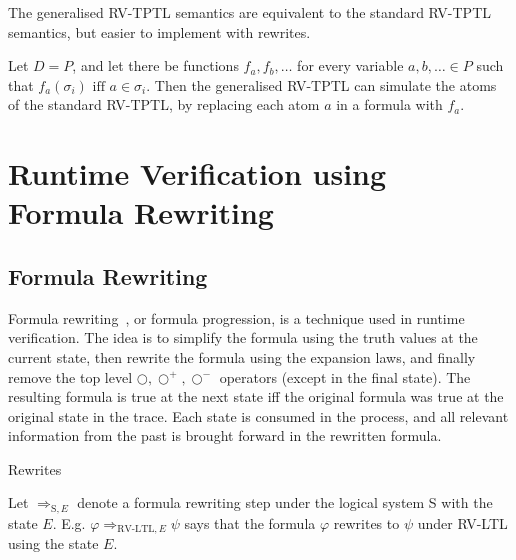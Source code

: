 \documentclass[a4paper]{article}
\newcommand{\tiff}{\text{ iff }}
\newcommand{\sn}{\bigcirc^+}
\newcommand{\wn}{\bigcirc^-}
\newcommand{\rw}[1]{\Rightarrow_{#1}}
\begin{document}
The generalised RV-TPTL semantics are equivalent to the standard RV-TPTL semantics, but easier to implement with rewrites. %

\begin{remk}
  Let $D = P$, and let there be functions $f_a,f_b,\dots$ for every variable $a,b,\dots\in P$ such that $f_a(\sigma_i) \tiff a\in \sigma_i$. Then the generalised RV-TPTL can simulate the atoms of the standard RV-TPTL, by replacing each atom $a$ in a formula with $f_a$.

\end{remk}

\section{Runtime Verification using Formula Rewriting}
\subsection{Formula Rewriting}
Formula rewriting~\autocite{rosu2005rewriting}, or formula progression, is a technique used in runtime verification.
The idea is to simplify the formula using the truth values at the current state, then rewrite the formula using the expansion laws, and finally remove the top level $\bigcirc,\sn,\wn$ operators (except in the final state). The resulting formula is true at the next state iff the original formula was true at the original state in the trace.
Each state is consumed in the process, and all relevant information from the past is brought forward in the rewritten formula.

\begin{notn}{Rewrites}

  Let $\rw{\text{S},E}$ denote a formula rewriting step under the logical system S with the state $E$. E.g. $\varphi\rw{\text{RV-LTL},E}\psi$ says that the formula $\varphi$ rewrites to $\psi$ under RV-LTL using the state $E$.
\end{notn}
\end{document}

